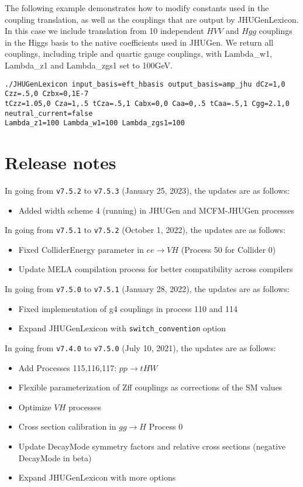 \documentclass[aps,superscriptaddress,nofootinbib]{revtex4}
\begin{document}
The following example demonstrates how to modify constants used in the coupling translation, as well as the couplings that are 
output by JHUGenLexicon. In this case we include translation from 10 independent $HVV$ and $Hgg$ couplings in the Higgs basis 
to the native coefficients used in JHUGen. We return all couplings, including triple and quartic gauge couplings, 
with Lambda\_w1, Lambda\_z1 and Lambda\_zgs1 set to 100GeV.

\begin{verbatim}
./JHUGenLexicon input_basis=eft_hbasis output_basis=amp_jhu dCz=1,0 Czz=.5,0 Czbx=0,1E-7 
tCzz=1.05,0 Cza=1,.5 tCza=.5,1 Cabx=0,0 Caa=0,.5 tCaa=.5,1 Cgg=2.1,0 neutral_current=false 
Lambda_z1=100 Lambda_w1=100 Lambda_zgs1=100
\end{verbatim}

\section{Release notes}
\noindent 
In going from \verb|v7.5.2| to \verb|v7.5.3| (January 25, 2023), the updates are as follows:
\noindent
\begin{itemize}
\item Added width scheme 4 (running) in JHUGen and MCFM-JHUGen processes
\end{itemize}
\noindent 
In going from \verb|v7.5.1| to \verb|v7.5.2| (October 1, 2022), the updates are as follows:
\noindent
\begin{itemize}
\item Fixed ColliderEnergy parameter in $ee\to VH$ (Process 50 for Collider 0)
\item Update MELA compilation process for better compatibility across compilers
\end{itemize}
In going from \verb|v7.5.0| to \verb|v7.5.1| (January 28, 2022), the updates are as follows:
\noindent
\begin{itemize}
\item Fixed implementation of g4 couplings in process 110 and 114 
\item Expand JHUGenLexicon with \verb|switch_convention| option
\end{itemize}
In going from \verb|v7.4.0| to \verb|v7.5.0| (July 10, 2021), the updates are as follows:
\begin{itemize}
\item Add Processes 115,116,117: $pp\to tHW$
\item Flexible parameterization of Zff couplings as corrections of the SM values 
\item Optimize $VH$ processes 
\item Cross section calibration in $gg\to H$ Process 0
\item Update DecayMode symmetry factors and relative cross sections (negative DecayMode in beta)
\item Expand JHUGenLexicon with more options 
\end{itemize}
\end{document}
